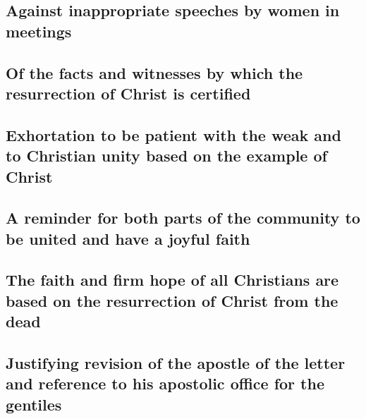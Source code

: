 \hypertarget{against-inappropriate-speeches-by-women-in-meetings}{%
\subsection{Against inappropriate speeches by women in
meetings}\label{against-inappropriate-speeches-by-women-in-meetings}}

\hypertarget{of-the-facts-and-witnesses-by-which-the-resurrection-of-christ-is-certified}{%
\subsection{Of the facts and witnesses by which the resurrection of
Christ is
certified}\label{of-the-facts-and-witnesses-by-which-the-resurrection-of-christ-is-certified}}

\hypertarget{exhortation-to-be-patient-with-the-weak-and-to-christian-unity-based-on-the-example-of-christ}{%
\subsection{Exhortation to be patient with the weak and to Christian
unity based on the example of
Christ}\label{exhortation-to-be-patient-with-the-weak-and-to-christian-unity-based-on-the-example-of-christ}}

\hypertarget{a-reminder-for-both-parts-of-the-community-to-be-united-and-have-a-joyful-faith}{%
\subsection{A reminder for both parts of the community to be united and
have a joyful
faith}\label{a-reminder-for-both-parts-of-the-community-to-be-united-and-have-a-joyful-faith}}

\hypertarget{the-faith-and-firm-hope-of-all-christians-are-based-on-the-resurrection-of-christ-from-the-dead}{%
\subsection{The faith and firm hope of all Christians are based on the
resurrection of Christ from the
dead}\label{the-faith-and-firm-hope-of-all-christians-are-based-on-the-resurrection-of-christ-from-the-dead}}

\hypertarget{justifying-revision-of-the-apostle-of-the-letter-and-reference-to-his-apostolic-office-for-the-gentiles}{%
\subsection{Justifying revision of the apostle of the letter and
reference to his apostolic office for the
gentiles}\label{justifying-revision-of-the-apostle-of-the-letter-and-reference-to-his-apostolic-office-for-the-gentiles}}

